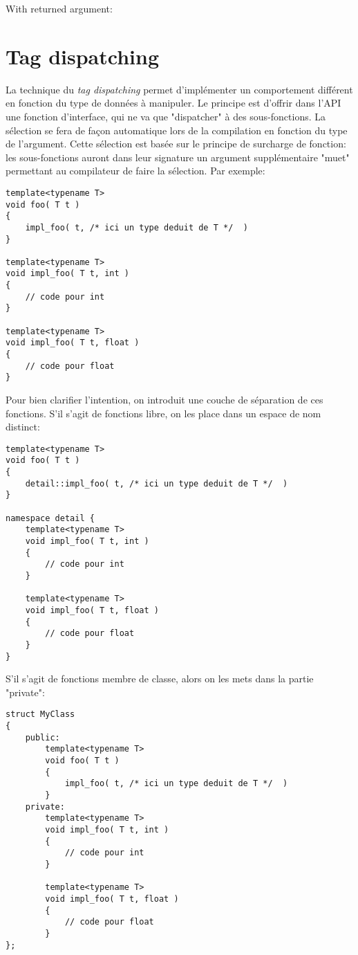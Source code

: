 \documentclass[11pt,a4paper]{article}
\begin{document}
With returned argument:


\section{Tag dispatching}

La technique du {\em tag dispatching}
permet d'implémenter un comportement différent en fonction du type de données à manipuler.
Le principe est d'offrir dans l'API une fonction d'interface, qui ne va que "dispatcher" à des sous-fonctions.
La sélection se fera de façon automatique lors de la compilation en fonction du type de l'argument.
Cette sélection est basée sur le principe de surcharge de fonction:
les sous-fonctions auront dans leur signature un argument supplémentaire "muet" permettant au compilateur de faire la sélection.
Par exemple:

\begin{lstlisting}
template<typename T>
void foo( T t )
{
	impl_foo( t, /* ici un type deduit de T */  )
}

template<typename T>
void impl_foo( T t, int )
{
	// code pour int
}

template<typename T>
void impl_foo( T t, float )
{
	// code pour float
}
\end{lstlisting}


Pour bien clarifier l'intention, on introduit une couche de séparation de ces fonctions.
S'il s'agit de fonctions libre, on les place dans un espace de nom distinct:
\begin{lstlisting}
template<typename T>
void foo( T t )
{
	detail::impl_foo( t, /* ici un type deduit de T */  )
}

namespace detail {
	template<typename T>
	void impl_foo( T t, int )
	{
		// code pour int
	}
	
	template<typename T>
	void impl_foo( T t, float )
	{
		// code pour float
	}
}
\end{lstlisting}

S'il s'agit de fonctions membre de classe, alors on les mets dans la partie "private":

\begin{lstlisting}
struct MyClass
{
	public:
		template<typename T>
		void foo( T t )
		{
			impl_foo( t, /* ici un type deduit de T */  )
		}
	private:
		template<typename T>
		void impl_foo( T t, int )
		{
			// code pour int
		}
		
		template<typename T>
		void impl_foo( T t, float )
		{
			// code pour float
		}
};
\end{lstlisting}
\end{document}
